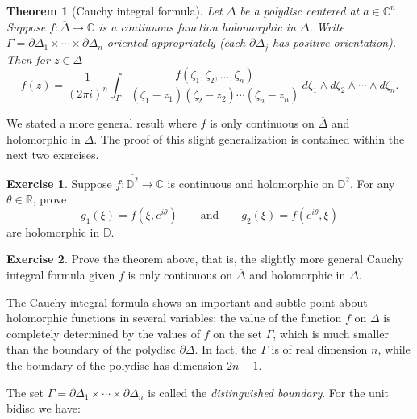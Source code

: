 \documentclass[12pt,openany]{book}
\newcommand{\C}{{\mathbb{C}}}
\newcommand{\R}{{\mathbb{R}}}
\newcommand{\D}{{\mathbb{D}}}
\newcommand{\myindex}[1]{#1\index{#1}}
\theoremstyle{plain}
\newtheorem{thm}{Theorem}[section]
\theoremstyle{remark}
\theoremstyle{definition}
\newenvironment{exbox}{%
    \def\FrameCommand{\vrule width 1pt \relax\hspace {10pt}}%
    \MakeFramed {\advance \hsize -\width \FrameRestore }%
}{%
    \endMakeFramed
}
\theoremstyle{exercise}
\newtheorem{exercise}{Exercise}[section]
\theoremstyle{example}
\begin{document}
\begin{thm}[Cauchy integral formula]
Let $\Delta$ be a polydisc centered at $a \in \C^n$.  Suppose
$f \colon \overline{\Delta} \to \C$ is a continuous function
holomorphic in $\Delta$.
Write $\Gamma = \partial \Delta_1 \times \cdots \times \partial \Delta_n$
oriented appropriately (each $\partial \Delta_j$ has positive orientation).
Then for $z \in \Delta$
\begin{equation*}
f(z) =
\frac{1}{{(2\pi i)}^n}
\int_{\Gamma}
\frac{f(\zeta_1,\zeta_2,\ldots,\zeta_n)}{(\zeta_1-z_1)(\zeta_2-z_2)\cdots(\zeta_n-z_n)}
\,
d \zeta_1 
\wedge
d \zeta_2
\wedge
\cdots
\wedge
d \zeta_n .
\end{equation*}
\end{thm}

We stated a more general result where $f$ is only continuous 
on $\overline{\Delta}$ and holomorphic in $\Delta$.  The proof of this
slight generalization is contained within the next two exercises.

\begin{exbox}
\begin{exercise}
Suppose $f \colon \overline{\D^2} \to \C$ is continuous and holomorphic
on $\D^2$.  For any $\theta \in \R$, prove
\begin{equation*}
g_1(\xi) = f(\xi,e^{i\theta}) \qquad \text{and} \qquad
g_2(\xi) = f(e^{i\theta},\xi)
\end{equation*}
are holomorphic in $\D$.
\end{exercise}

\begin{exercise}
Prove the theorem above, that is, the slightly more general Cauchy integral
formula given $f$ is only continuous on $\overline{\Delta}$ and
holomorphic in $\Delta$.
\end{exercise}
\end{exbox}


The Cauchy integral formula shows
an important and subtle point about holomorphic functions in several
variables:
the value of
the function $f$ on $\Delta$ is completely determined by the values of $f$ on
the set $\Gamma$, which is much smaller than the boundary of the polydisc
$\partial \Delta$.  In fact, the $\Gamma$ is of real dimension $n$, while
the boundary of the polydisc has dimension $2n-1$.

The set $\Gamma = \partial \Delta_1 \times \cdots \times \partial \Delta_n$
is called the \emph{\myindex{distinguished boundary}}.  For
the unit bidisc we have:
\end{document}
